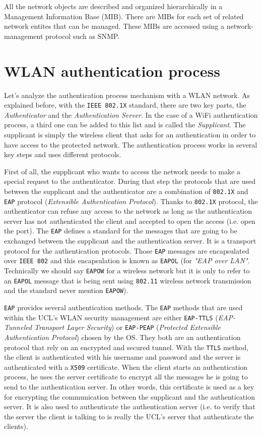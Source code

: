 All the network objects are described and organized hierarchically in a Management Information Base (MIB). There are MIBs for each set of related network entites that can be managed. These MIBs are accessed using a network-management protocol such as SNMP.



\section{WLAN authentication process}
Let's analyze the authentication process mechanism with a WLAN network.
As explained before, with the \texttt{IEEE 802.1X} standard, there are two key parts, the \textit{Authenticator} and the \textit{Authentication Server}. In the case of a WiFi authentication process, a third one can be added to this list and is called the \textit{Supplicant}. The supplicant is simply the wireless client that asks for an authentication in order to have access to the protected network. The authentication process works in several key steps and uses different protocols.

First of all, the supplicant who wants to access the network needs to make a special request to the authenticator. During that step the protocols that are used between the supplicant and the authenticator are a combination of \texttt{802.1X} and \texttt{EAP} protocol (\textit{Extensible Authentication Protocol}). Thanks to \texttt{802.1X} protocol, the authenticator can refuse any access to the network as long as the authentication server has not authenticated the client and accepted to open the access (i.e. open the port). The \texttt{EAP} defines a standard for the messages that are going to be exchanged between the supplicant and the authentication server. It is a  transport protocol for the authentication protocols. Those \texttt{EAP} messages are encapsulated over \texttt{IEEE 802} and this encapsulation is known as \texttt{EAPOL} (for \textit{"EAP over LAN"}. Technically we should say \texttt{EAPOW} for a wireless network but it is only to refer to an \texttt{EAPOL} message that is being sent using \texttt{802.11} wireless network transmission and the standard never mention \texttt{EAPOW}).

\texttt{EAP} provides several authentication methods. The \texttt{EAP} methods that are used within the UCL's WLAN  security management are either \texttt{EAP-TTLS} (\textit{EAP-Tunneled Transport Layer Security}) or \texttt{EAP-PEAP} (\textit{Protected Extensible Authentication Protocol}) chosen by the OS. They both are an authentication protocol that rely on an encrypted and secured tunnel. With the \texttt{TTLS} method, the client is authenticated with his username and password and the server is authenticated with a \texttt{X509} certificate. When the client starts an authentication process, he uses the server certificate to encrypt all the messages he is going to send to the authentication server. In other words, this certificate is used as a key for encrypting the communication between the supplicant and the authentication server. It is also used to authenticate the authentication server (i.e. to verify that the server the client is talking to is really the UCL's server that authenticate the clients).



